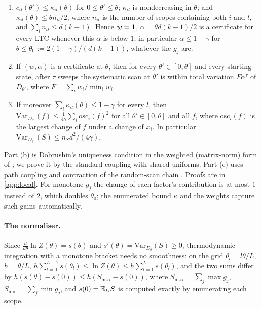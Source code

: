 \begin{lemma}\label{lem:local-mix}
\begin{enumerate}[label=(\alph*)]
\item $c_{il}(\theta')\le\kappa_{il}(\theta)$ for $0\le\theta'\le\theta$; $\kappa_{il}$ is
nondecreasing in $\theta$; and $\kappa_{il}(\theta)\le\theta n_{il}/2$, where $n_{il}$ is
the number of scopes containing both $i$ and $l$, and $\sum_{l}n_{il}\le d(k-1)$.
Hence $w=\mathbf{1}$, $\alpha=\theta d(k-1)/2$ is a certificate for every LTC whenever this
$\alpha$ is below $1$; in particular $\alpha\le1-\gamma$ for
$\theta\le\theta_0:=2(1-\gamma)/(d(k-1))$, whatever the $g_j$ are.
\item If $(w,\alpha)$ is a certificate at $\theta$, then for every $\theta'\in[0,\theta]$ and
every starting state, after $\tau$ sweeps the systematic scan at $\theta'$ is within
total variation $F\alpha^\tau$ of $D_{\theta'}$, where $F=\sum_iw_i/\min_iw_i$.
\item If moreover $\sum_i\kappa_{il}(\theta)\le1-\gamma$ for every $l$, then
$\mathrm{Var}_{D_{\theta'}}(f)\le\frac1{4\gamma}\sum_i\mathrm{osc}_i(f)^2$ for all
$\theta'\in[0,\theta]$ and all $f$, where $\mathrm{osc}_i(f)$ is the largest change of
$f$ under a change of $x_i$. In particular $\mathrm{Var}_{D_{\theta'}}(S)\le n_Sd^2/(4\gamma)$.
\end{enumerate}
\end{lemma}

Part (b) is Dobrushin's uniqueness condition \cite{dobrushin1970} in the weighted
(matrix-norm) form of \cite{dgj2009}; we prove it by the standard coupling with
shared uniforms. Part (c) uses path coupling \cite{bubleydyer1997} and contraction of
the random-scan chain \cite[Section~13.1]{lpw2017}. Proofs are in \cref{app:local}. For monotone $g_j$ the
change of each factor's contribution is at most $1$ instead of $2$, which doubles
$\theta_0$; the enumerated bound $\kappa$ and the weights capture such gains
automatically.

\paragraph{The normaliser.} Since $\frac{d}{d\theta}\ln Z(\theta)=s(\theta)$ and
$s'(\theta)=\mathrm{Var}_{D_\theta}(S)\ge0$, thermodynamic integration
\cite{gm1998} with a monotone bracket needs no smoothness: on the grid
$\theta_l=l\theta/L$, $h=\theta/L$,
$h\sum_{l=0}^{L-1}s(\theta_l)\le\ln Z(\theta)\le h\sum_{l=1}^{L}s(\theta_l)$, and the two
sums differ by $h(s(\theta)-s(0))\le h(S_{\max}-s(0))$, where $S_{\max}=\sum_j\max g_j$,
$S_{\min}=\sum_j\min g_j$, and $s(0)=\mathbb{E}_DS$ is computed exactly by enumerating each scope.

